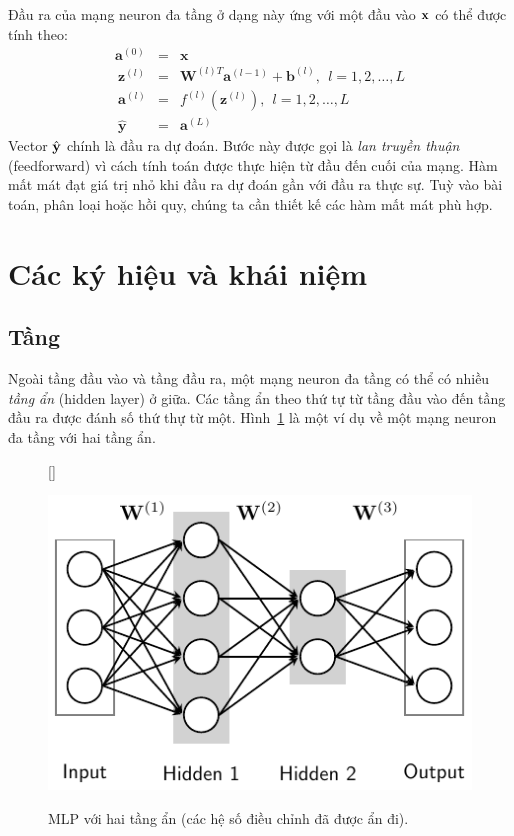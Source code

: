 
Đầu ra của mạng neuron đa tầng ở dạng này ứng với một đầu vào $\mathbf{x}$ có thể
được tính theo:
\begin{eqnarray} \mathbf{a}^{(0)} &=& \mathbf{x} \\\
\mathbf{z}^{(l)}  &=& \mathbf{W}^{(l)T}\mathbf{a}^{(l-1)} + \mathbf{b}^{(l)},~~ l =  1, 2, \dots, L \\\
\mathbf{a}^{(l)} &=& f^{(l)}(\mathbf{z}^{(l)}), ~~ l =  1, 2, \dots, L \\\
\mathbf{\hat{y}} &=& \mathbf{a}^{(L)}
\end{eqnarray}
Vector $\hat{\mathbf{y}}$ chính là đầu ra dự đoán. Bước này được gọi là \textit{lan truyền thuận} (feedforward) vì cách
tính toán được thực hiện từ đầu đến cuối của mạng. Hàm mất mát đạt
giá trị nhỏ khi đầu ra dự đoán gần với đầu ra thực sự. Tuỳ vào bài toán, phân loại hoặc hồi quy, chúng ta cần thiết kế các hàm mất mát phù hợp.

\section{Các ký hiệu và khái niệm}

\index{tầng -- layer}

\subsection{Tầng}
Ngoài tầng đầu vào và tầng đầu ra, một mạng neuron đa tầng có thể có nhiều
\textit{tầng ẩn} ({hidden layer}) ở giữa. Các tầng ẩn theo thứ tự từ tầng đầu
vào đến tầng đầu ra được đánh số thứ thự từ một. Hình~\ref{fig:14_3} là một ví
dụ về một mạng neuron đa tầng với hai tầng ẩn.


\begin{figure}[t]
[\FBwidth]
{\caption{
MLP với hai tầng ẩn (các hệ số điều chỉnh đã được ẩn đi).
}
\label{fig:14_3}}
{ %
\includegraphics[width=.5\textwidth]{Chapters/05_NeuralNetworks/14_mlp/latex/multi_layers.pdf}
}
\end{figure}


